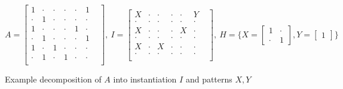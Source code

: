 
\small
$$
A =
\begin{bmatrix}
1 & \cdot & \cdot & \cdot & \cdot & 1 &  \\[-.2em]
\cdot & 1 & \cdot & \cdot & \cdot & \cdot &  \\[-.2em]
1 & \cdot & \cdot & \cdot & 1 & \cdot &  \\[-.2em]
\cdot & 1 & \cdot & \cdot & \cdot & 1 &  \\[-.2em]
1 & \cdot & 1 & \cdot & \cdot & \cdot &  \\[-.2em]
\cdot & 1 & \cdot & 1 & \cdot & \cdot &  \\
\end{bmatrix}\!\!, \
I = 
\begin{bmatrix}
X & \cdot & \cdot & \cdot & \cdot & Y &  \\[-.2em]
\cdot & \cdot & \cdot & \cdot & \cdot & \cdot &  \\[-.2em]
X & \cdot & \cdot & \cdot & X & \cdot &  \\[-.2em]
\cdot & \cdot & \cdot & \cdot & \cdot & \cdot &  \\[-.2em]
X & \cdot & X & \cdot & \cdot & \cdot &  \\[-.2em]
\cdot & \cdot & \cdot & \cdot & \cdot & \cdot &  \\
\end{bmatrix}\!\!, \
H = \{
X =
\begin{bmatrix}
1 & \cdot \\[-.2em]
\cdot & 1
\end{bmatrix}\!\!,
Y =
\begin{bmatrix}
1
\end{bmatrix}\}
$$
\caption{Example decomposition of $A$ into instantiation $I$ and patterns $X,Y$}
